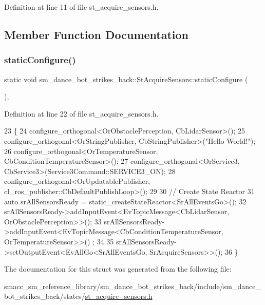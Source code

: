 Definition at line 11 of file st\+\_\+acquire\+\_\+sensors.\+h.



\subsection{Member Function Documentation}
\mbox{\label{structsm__dance__bot__strikes__back_1_1StAcquireSensors_a83de29e9c8ce05f82c487b91255f9fe1}} 
\subsubsection{\texorpdfstring{static\+Configure()}{staticConfigure()}}
{\footnotesize\ttfamily static void sm\+\_\+dance\+\_\+bot\+\_\+strikes\+\_\+back\+::\+St\+Acquire\+Sensors\+::static\+Configure (\begin{DoxyParamCaption}{ }\end{DoxyParamCaption})\hspace{0.3cm}{\ttfamily [inline]}, {\ttfamily [static]}}



Definition at line 22 of file st\+\_\+acquire\+\_\+sensors.\+h.


\begin{DoxyCode}
23    \{
24       configure\_orthogonal<OrObstaclePerception, CbLidarSensor>();
25       configure\_orthogonal<OrStringPublisher, CbStringPublisher>(\textcolor{stringliteral}{"Hello World!"});
26       configure\_orthogonal<OrTemperatureSensor, CbConditionTemperatureSensor>();
27       configure\_orthogonal<OrService3, CbService3>(Service3Command::SERVICE3\_ON);
28       configure\_orthogonal<OrUpdatablePublisher, cl\_ros\_publisher::CbDefaultPublishLoop>();
29 
30       \textcolor{comment}{// Create State Reactor}
31       \textcolor{keyword}{auto} srAllSensorsReady = static\_createStateReactor<SrAllEventsGo>();
32       srAllSensorsReady->addInputEvent<EvTopicMessage<CbLidarSensor, OrObstaclePerception>>();
33       srAllSensorsReady->addInputEvent<EvTopicMessage<CbConditionTemperatureSensor, OrTemperatureSensor>>()
      ;
34 
35       srAllSensorsReady->setOutputEvent<EvAllGo<SrAllEventsGo, SrAcquireSensors>>();
36    \}
\end{DoxyCode}


The documentation for this struct was generated from the following file\+:\begin{DoxyCompactItemize}
\item 
smacc\+\_\+sm\+\_\+reference\+\_\+library/sm\+\_\+dance\+\_\+bot\+\_\+strikes\+\_\+back/include/sm\+\_\+dance\+\_\+bot\+\_\+strikes\+\_\+back/states/\hyperlink{strikes__back_2include_2sm__dance__bot__strikes__back_2states_2st__acquire__sensors_8h}{st\+\_\+acquire\+\_\+sensors.\+h}\end{DoxyCompactItemize}
